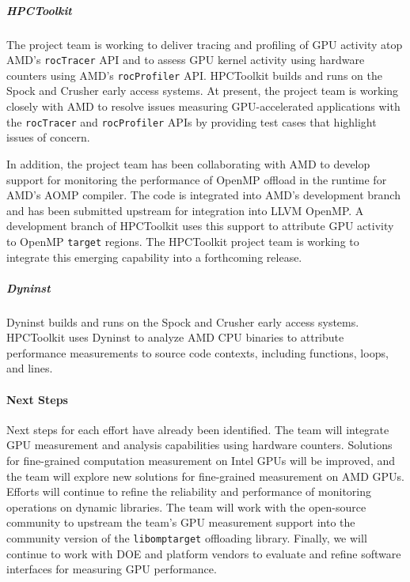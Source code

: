 \subparagraph{HPCToolkit}
The project team is working to deliver tracing and profiling of GPU activity atop AMD's \texttt{rocTracer} API and to assess GPU kernel activity using hardware counters using AMD's \texttt{rocProfiler} API. 
HPCToolkit builds and runs on the Spock and Crusher early access systems. 
At present, the project team is working closely with AMD to 
resolve issues measuring GPU-accelerated
applications with the \texttt{rocTracer} and \texttt{rocProfiler} APIs
by providing test cases that highlight issues of concern.

In addition, the project team has been collaborating with AMD to develop
support for monitoring the performance of OpenMP offload in the
runtime for AMD's AOMP compiler. The code is integrated into AMD's development
branch and has been submitted upstream
for integration into LLVM OpenMP.  A development branch of HPCToolkit
uses this support to attribute GPU activity to OpenMP \texttt{target}
regions. The HPCToolkit project team is working to integrate this 
emerging capability into a forthcoming release.
\subparagraph{Dyninst}
Dyninst builds and runs on the Spock and Crusher early access systems. 
HPCToolkit uses Dyninst to analyze AMD CPU binaries to attribute 
performance measurements to source code contexts, 
including functions, loops, and lines.   


\paragraph{Next Steps}
Next steps for each effort have already been identified.
%
The team will integrate GPU measurement and analysis capabilities using hardware counters.
%
Solutions for fine-grained computation measurement on Intel GPUs will be improved, and the team will explore new solutions for fine-grained measurement on AMD GPUs.
%
Efforts will continue to refine the reliability and performance of monitoring operations on dynamic libraries.
%
The team will work with the open-source community to upstream the team's GPU measurement support into the community version of the \texttt{libomptarget} offloading library.
%
Finally, we will continue to work with DOE and platform vendors to evaluate and refine software interfaces for measuring GPU performance.


